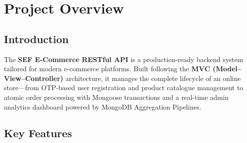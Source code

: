 \chapter{Project Overview}

\section{Introduction}

The \textbf{SEF E-Commerce RESTful API} is a production-ready backend system tailored for modern e-commerce platforms. Built following the \textbf{MVC (Model--View--Controller)} architecture, it manages the complete lifecycle of an online store---from OTP-based user registration and product catalogue management to atomic order processing with Mongoose transactions and a real-time admin analytics dashboard powered by MongoDB Aggregation Pipelines.

\section{Key Features}

